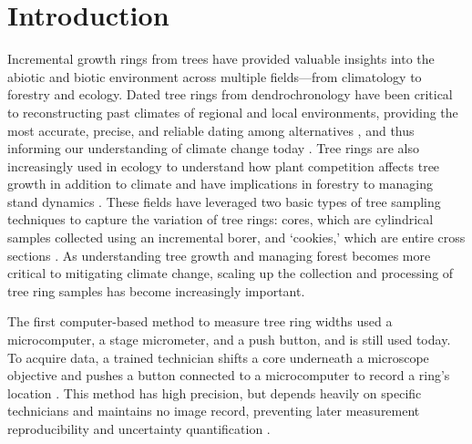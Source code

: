 \documentclass[a4paper,12pt]{article}
\begin{document}
\section{Introduction} 
Incremental growth rings from trees have provided valuable insights into the abiotic and biotic environment across multiple fields---from climatology to forestry and ecology. Dated tree rings from dendrochronology have been critical to
reconstructing past climates of regional and local environments, providing the most accurate, precise, and reliable dating among alternatives \citep{mann_northern_1999}, and thus informing  our understanding of climate change today \citep{fritts_dendroclimatology_1971,williams_using_2010,guibal_dendrochronology_2021,sheppard_dendroclimatology_2010,williams_large_2020}. Tree rings are also increasingly used in ecology to understand how plant competition affects tree growth in addition to climate \citep{buechling_climate_2017} and have implications in forestry to managing stand dynamics \citep{canham_neighborhood_2004}. These fields have leveraged two basic types of tree sampling techniques to capture the variation of tree rings: cores, which are cylindrical samples collected using an incremental borer, and `cookies,' which are entire cross sections \citep[and thus allow measuring as many radii from the sample as desired,][]{speer_fundamentals_2010}. As understanding tree growth and managing forest becomes more critical to mitigating climate change, scaling up the collection and processing of tree ring samples has become increasingly important.

The first computer-based method to measure tree ring widths used a microcomputer, a stage micrometer, and a push button, and is still used today. To acquire data, a trained technician shifts a core underneath a microscope objective and pushes a button connected to a microcomputer to record a ring's location \citep{robinson_microcomputer_1980}.
This method has high precision, but depends heavily on specific technicians and maintains no image record, preventing later measurement reproducibility and uncertainty quantification \citep{levanic_atrics_2007}.
\end{document}
